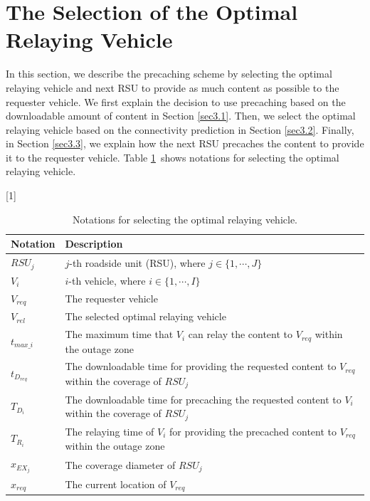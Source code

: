 \documentclass[electronics,aricle,accept,pdftex,moreauthors]{Definitions/mdpi}
\begin{document}
\section{The Selection of the Optimal Relaying Vehicle} \label{sec3}
In this section, we describe the precaching scheme by selecting the optimal relaying vehicle and next RSU to provide as much content as possible to the requester vehicle. We first explain the decision to use precaching based on the downloadable amount of content in Section \ref{sec3.1}. Then, we select the optimal relaying vehicle based on the connectivity prediction in Section \ref{sec3.2}. Finally, in Section \ref{sec3.3}, we explain how the next RSU precaches the content to provide it to the requester vehicle.
Table \ref{tab.1}~shows notations for selecting the optimal relaying vehicle.


\begin{table}[H] %
\tablesize{\footnotesize}

  \caption{Notations for selecting the optimal relaying vehicle.}

\setlength{\cellWidtha}{\textwidth/2-2\tabcolsep-2.2in}
\setlength{\cellWidthb}{\textwidth/2-2\tabcolsep+2.2in}
\scalebox{1}[1]{\begin{tabularx}{\textwidth}{>{\centering\arraybackslash}m{\cellWidtha}>{\raggedright
\arraybackslash}m{\cellWidthb}}
\toprule

           \textbf{Notation} & \textbf{Description}\\
\midrule
        $RSU_{j}$ & $j$-th roadside unit (RSU), where $j\in \{1, \cdots, J\}$\\
        $V_{i}$ & $i$-th vehicle, where $i \in \{1, \cdots, I\}$ \\
        $V_{req}$ & The requester vehicle\\
        $V_{rel}$ & The selected optimal relaying vehicle\\
        $t_{max\_i}$ & The maximum time that $V_{i}$ can relay the content to $V_{req}$ within the outage zone \\
        $t_{D_{req}}$ & The downloadable time for providing the requested content to $V_{req}$ within the coverage of $RSU_{j}$ \\
        $T_{D_{i}}$ & The downloadable time for precaching the requested content to $V_{i}$ within the coverage of $RSU_{j}$ \\
        $T_{R_{i}}$ & The relaying time of $V_{i}$ for providing the precached content to $V_{req}$ within the outage zone \\
        $x_{EX_{j}}$ & The coverage diameter of $RSU_{j}$ \\
        $x_{req}$ & The current location of $V_{req}$ \\


   \bottomrule
    \end{tabularx}}
    \label{tab.1}
\end{table}
\end{document}
